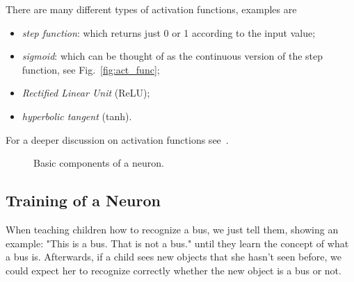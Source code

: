 There are many different types of activation functions, examples are
\begin{itemize}
\item \emph{step function}: which returns just 0 or 1 according to the input value;
\item \emph{sigmoid}: which can be thought of as the continuous version of the step function, see Fig.~\ref{fig:act_func};
\item \emph{Rectified Linear Unit} (ReLU);
\item \emph{hyperbolic tangent} (tanh).
\end{itemize}

For a deeper discussion on activation functions see~\cite{bib:activation_function}.

\begin{figure}[htb]
\centering
{}
\caption{Basic components of a neuron.}
\label{fig:sigmoid}
\end{figure}

\subsection{Training of a Neuron}
\label{training-of-a-neuron}

When teaching children how to recognize a bus, we just tell them, showing an example: "This is a bus. That is not a bus." until they learn the concept of what a bus is. Afterwards, if a child sees new objects that she hasn't seen before, we could expect her to recognize correctly whether the new object is a bus or not.

